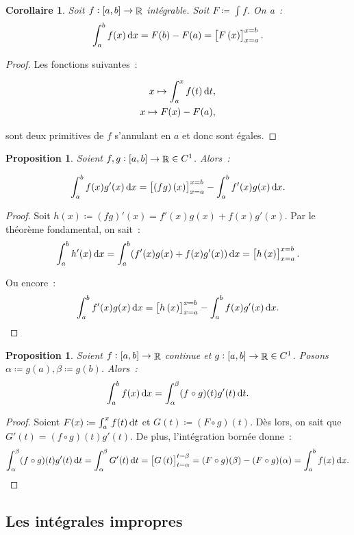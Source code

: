 \documentclass{article}
\DeclareMathOperator{\R}{\mathbb R}
\newcommand{\ab}{\interval ab}
\newcommand{\fabr}[1]{#1 : \ab \to \R}
\newcommand{\evf}[4]{\left[#1\left(#2\right)\right]_{#2=#3}^{#2=#4}}
\newtheorem{prp}[thm]{Proposition}
\newtheorem{cor}[thm]{Corollaire}
\theoremstyle{definition}
\theoremstyle{remark}
\begin{document}
		\begin{cor} Soit $\fabr f$ intégrable. Soit $F \coloneqq \int f$. On a~:
		\[\int_a^b f(x)\dif x = F(b) - F(a) = \evf Fxab.\]
		\end{cor}

		\begin{proof} Les fonctions suivantes~:

		\begin{align*}
			x \mapsto \int_a^xf(t)\dif t, \\
			x \mapsto F(x) - F(a),
		\end{align*}

		sont deux primitives de $f$ s'annulant en $a$ et donc sont égales. \end{proof}

		\begin{prp} Soient $\fabr {f, g} \in C^1$. Alors~:

		\[\int_a^bf(x)g'(x)\dif x = \evf {(fg)}xab - \int_a^bf'(x)g(x)\dif x.\]
		\end{prp}

		\begin{proof} Soit $h(x) \coloneqq (fg)'(x) = f'(x)g(x) + f(x)g'(x)$. Par le théorème fondamental, on sait~:
		\[\int_a^bh'(x)\dif x = \int_a^b(f'(x)g(x) + f(x)g'(x))\dif x = \evf hxab.\]

		Ou encore~:
		\[\int_a^bf'(x)g(x)\dif x = \evf hxab - \int_a^bf(x)g'(x)\dif x.\]
		\end{proof}

		\begin{prp} Soient $\fabr f$ continue et $\fabr g \in C^1$. Posons $\alpha \coloneqq g(a), \beta \coloneqq g(b)$. Alors~:
		\[\int_a^bf(x)\dif x = \int_\alpha^\beta(f \circ g)(t)g'(t)\dif t.\]
		\end{prp}

		\begin{proof} Soient $F(x) \coloneqq \int_a^xf(t)\dif t$ et $G(t) \coloneqq (F \circ g)(t)$. Dès lors, on sait que $G'(t) = (f \circ g)(t)g'(t)$.
		De plus, l'intégration bornée donne~:
		\[\int_\alpha^\beta (f \circ g)(t)g'(t)\dif t = \int_\alpha^\beta G'(t)\dif t = \evf Gt\alpha\beta
		= (F \circ g)(\beta)-(F \circ g)(\alpha) = \int_a^b f(x)\dif x.\]
		\end{proof}

	\subsection{Les intégrales impropres}
\end{document}
